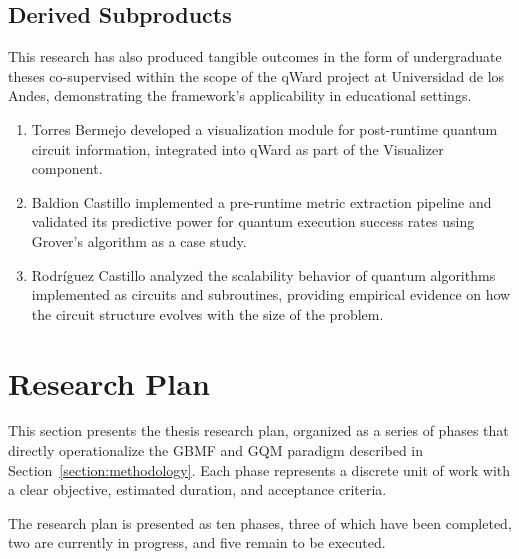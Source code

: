 \documentclass{article}
\begin{document}
\subsection{Derived Subproducts}

This research has also produced tangible outcomes in the form of undergraduate theses co-supervised within the scope of the qWard project at Universidad de los Andes, demonstrating the framework's applicability in educational settings.

\begin{enumerate}

\item Torres Bermejo \cite{torresBermejoVisualizationsPostRuntime_2025} developed a visualization module for post-runtime quantum circuit information, integrated into qWard as part of the Visualizer component.

\item Baldion Castillo \cite{baldionCastilloPreRuntimeMetrics_2026} implemented a pre-runtime metric extraction pipeline and validated its predictive power for quantum execution success rates using Grover's algorithm as a case study.

\item Rodr\'{i}guez Castillo \cite{rodriguezCastilloScalabilityQuantum_2026} analyzed the scalability behavior of quantum algorithms implemented as circuits and subroutines, providing empirical evidence on how the circuit structure evolves with the size of the problem.

\end{enumerate}

\section{Research Plan}
\label{section:work}

This section presents the thesis research plan, organized as a series of phases that directly operationalize the GBMF and GQM paradigm described in Section~\ref{section:methodology}. Each phase represents a discrete unit of work with a clear objective, estimated duration, and acceptance criteria.

The research plan is presented as ten phases, three of which have been completed, two are currently in progress, and five remain to be executed.
\end{document}
